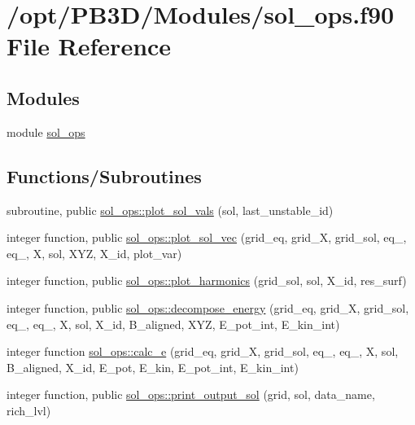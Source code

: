 \hypertarget{sol__ops_8f90}{}\section{/opt/\+P\+B3\+D/\+Modules/sol\+\_\+ops.f90 File Reference}
\label{sol__ops_8f90}
\subsection*{Modules}
\begin{DoxyCompactItemize}
\item 
module \hyperlink{namespacesol__ops}{sol\+\_\+ops}
\end{DoxyCompactItemize}
\subsection*{Functions/\+Subroutines}
\begin{DoxyCompactItemize}
\item 
subroutine, public \hyperlink{namespacesol__ops_a0d4a798a56cfee9bced781d116852165}{sol\+\_\+ops\+::plot\+\_\+sol\+\_\+vals} (sol, last\+\_\+unstable\+\_\+id)
\item 
integer function, public \hyperlink{namespacesol__ops_ae14af60a6f8f77e7dde1e93dbaa7e6d0}{sol\+\_\+ops\+::plot\+\_\+sol\+\_\+vec} (grid\+\_\+eq, grid\+\_\+X, grid\+\_\+sol, eq\+\_, eq\+\_, X, sol, X\+YZ, X\+\_\+id, plot\+\_\+var)
\item 
integer function, public \hyperlink{namespacesol__ops_ab9a1e138cb94b547f4fd7669c677ed5c}{sol\+\_\+ops\+::plot\+\_\+harmonics} (grid\+\_\+sol, sol, X\+\_\+id, res\+\_\+surf)
\item 
integer function, public \hyperlink{namespacesol__ops_a5e15aa2fa915e7de74ce74f02cd35fac}{sol\+\_\+ops\+::decompose\+\_\+energy} (grid\+\_\+eq, grid\+\_\+X, grid\+\_\+sol, eq\+\_, eq\+\_, X, sol, X\+\_\+id, B\+\_\+aligned, X\+YZ, E\+\_\+pot\+\_\+int, E\+\_\+kin\+\_\+int)
\item 
integer function \hyperlink{namespacesol__ops_aaeb4b122754fc6a4f538b22d72b6cba0}{sol\+\_\+ops\+::calc\+\_\+e} (grid\+\_\+eq, grid\+\_\+X, grid\+\_\+sol, eq\+\_, eq\+\_, X, sol, B\+\_\+aligned, X\+\_\+id, E\+\_\+pot, E\+\_\+kin, E\+\_\+pot\+\_\+int, E\+\_\+kin\+\_\+int)
\item 
integer function, public \hyperlink{namespacesol__ops_abd5b3b2d7008f482dd38f898a3300357}{sol\+\_\+ops\+::print\+\_\+output\+\_\+sol} (grid, sol, data\+\_\+name, rich\+\_\+lvl)
\end{DoxyCompactItemize}
